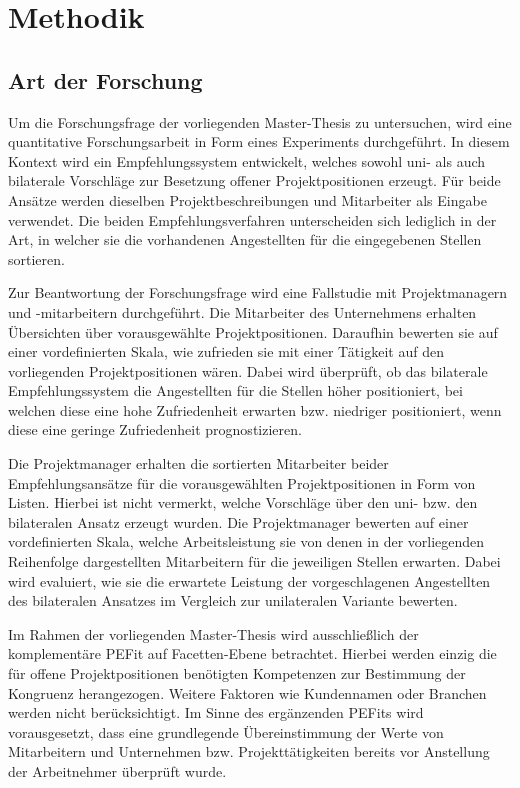 \chapter{Methodik}
\label{ch:methodik}

\section{Art der Forschung}
\label{ch:methodik:art}
Um die Forschungsfrage der vorliegenden Master-Thesis zu untersuchen, wird eine quantitative Forschungsarbeit in Form eines Experiments durchgeführt. In diesem Kontext wird ein Empfehlungssystem entwickelt, welches sowohl uni- als auch bilaterale Vorschläge zur Besetzung offener Projektpositionen erzeugt. Für beide Ansätze werden dieselben Projektbeschreibungen und Mitarbeiter als Eingabe verwendet. Die beiden Empfehlungsverfahren unterscheiden sich lediglich in der Art, in welcher sie die vorhandenen Angestellten für die eingegebenen Stellen sortieren.

Zur Beantwortung der Forschungsfrage wird eine Fallstudie mit Projektmanagern und -mitarbeitern durchgeführt. Die Mitarbeiter des Unternehmens erhalten Übersichten über vorausgewählte Projektpositionen. Daraufhin bewerten sie auf einer vordefinierten Skala, wie zufrieden sie mit einer Tätigkeit auf den vorliegenden Projektpositionen wären. Dabei wird überprüft, ob das bilaterale Empfehlungssystem die Angestellten für die Stellen höher positioniert, bei welchen diese eine hohe Zufriedenheit erwarten bzw. niedriger positioniert, wenn diese eine geringe Zufriedenheit prognostizieren.

Die Projektmanager erhalten die sortierten Mitarbeiter beider Empfehlungsansätze für die vorausgewählten Projektpositionen in Form von Listen. Hierbei ist nicht vermerkt, welche Vorschläge über den uni- bzw. den bilateralen Ansatz erzeugt wurden. Die Projektmanager bewerten auf einer vordefinierten Skala, welche Arbeitsleistung sie von denen in der vorliegenden Reihenfolge dargestellten Mitarbeitern für die jeweiligen Stellen erwarten. Dabei wird evaluiert, wie sie die erwartete Leistung der vorgeschlagenen Angestellten des bilateralen Ansatzes im Vergleich zur unilateralen Variante bewerten.

Im Rahmen der vorliegenden Master-Thesis wird ausschließlich der komplementäre \ac{PEFit} auf Facetten-Ebene betrachtet. Hierbei werden einzig die für offene Projektpositionen benötigten Kompetenzen zur Bestimmung der Kongruenz herangezogen. Weitere Faktoren wie Kundennamen oder Branchen werden nicht berücksichtigt. Im Sinne des ergänzenden \acp{PEFit} wird vorausgesetzt, dass eine grundlegende Übereinstimmung der Werte von Mitarbeitern und Unternehmen bzw. Projekttätigkeiten bereits vor Anstellung der Arbeitnehmer überprüft wurde.

